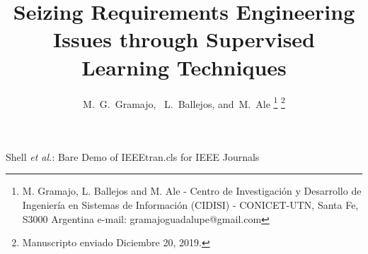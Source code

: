 \documentclass[journal]{IEEEtran}
\begin{document}
%
\title{Seizing Requirements Engineering Issues through Supervised Learning Techniques}
%
%
%

\author{M.~G.~Gramajo,~
    L.~Ballejos, and~M.~Ale%
\thanks{M. Gramajo, L. Ballejos and M. Ale - Centro de Investigaci\'on y Desarrollo de Ingenier\'ia en Sistemas de Informaci\'on (CIDISI) - CONICET-UTN, Santa Fe, S3000 Argentina   e-mail: gramajoguadalupe@gmail.com }
\thanks{Manuscripto enviado Diciembre 20, 2019.}}

% 
%



%
{Shell \MakeLowercase{\textit{et al.}}: Bare Demo of IEEEtran.cls for IEEE Journals}
% 
\end{document}
